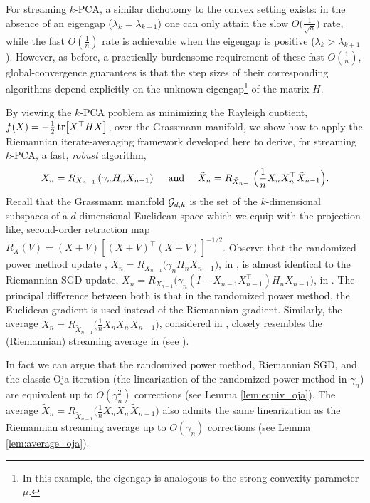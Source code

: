   For streaming $k$-PCA, a similar dichotomy to the convex setting exists: in the absence of an eigengap ($\lambda_k=\lambda_{k+1}$) one can only attain the slow $O\big(\frac{1}{\sqrt{n}}\big)$ rate, while the fast $O(\frac{1}{n})$ rate is achievable when the eigengap is positive ($\lambda_k>\lambda_{k+1}$).
However, as before, a practically burdensome requirement of these fast $O (\frac{1}{n} )$, global-convergence guarantees is that the step sizes of their corresponding algorithms depend explicitly on the unknown eigengap\footnote{In this example, the eigengap is analogous to the strong-convexity parameter $\mu$.} of the matrix $H$.

 By viewing the
  $k$-PCA problem as minimizing the Rayleigh quotient, $f(X) = -\frac{1}{2} \tr [X^\top H X]$, over the Grassmann manifold, we show how to apply the Riemannian iterate-averaging framework developed here to derive, for streaming $k$-PCA, a fast, \textit{robust} algorithm,\vspace*{-7pt}
\begin{align}
  X_n = R_{X_{n-1}} \left(\gamma_n H_n X_{n-1}\right) \quad \text{ and } \quad  \tilde X_n = R_{\tilde X_{n-1}}\Big(\frac{1}{n} X_{n}X_{n}^\top \tilde X_{n-1}\Big). \label{eq:robust_oja}
  \vspace*{-10pt}
\end{align}
 Recall that the Grassmann manifold $\mathcal{G}_{d,k}$ is the set of the $k$-dimensional subspaces of a $d$-dimensional Euclidean space which we equip with the projection-like, second-order retraction map
$R_X(V)=(X+V)[(X+V)^\top(X+V)]^{-1/2}$.
Observe that the randomized power method update \citep{OjaKar85},
$
X_n = R_{X_{n-1}}\big( \gamma_n H_n  X_{n-1} \big)
$, in ,
is almost identical to the Riemannian SGD update,
$
X_n = R_{X_{n-1}}\big(\gamma_n(I-X_{n-1} X_{n-1}^{\top}) H_n X_{n-1}\big)
$, in .
The principal difference between both is that in the randomized power method, the Euclidean gradient is used instead of the Riemannian gradient. Similarly, the average $ \tilde X_n = R_{\tilde X_{n-1}}\big(\frac{1}{n} X_{n}X_{n}^\top \tilde X_{n-1}\big)$, considered in , closely resembles the (Riemannian) streaming average in  (see ).

In fact we can argue that the randomized power method, Riemannian SGD, and the classic Oja iteration (the linearization of the randomized power method in $\gamma_n$) are equivalent up to $O(\gamma_n^2)$ corrections (see Lemma \ref{lem:equiv_oja}). The average $ \tilde X_n = R_{\tilde X_{n-1}}\big(\frac{1}{n} X_{n}X_{n}^\top \tilde X_{n-1}\big)$ also admits the same linearization as the Riemannian streaming average up to $O(\gamma_n)$ corrections (see Lemma \ref{lem:average_oja}).

